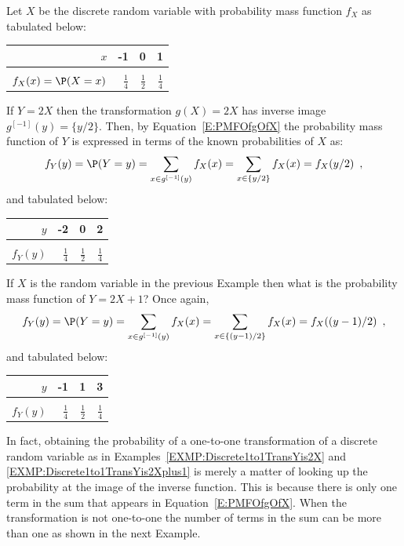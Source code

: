 \begin{example}\label{EXMP:Discrete1to1TransYis2X}
Let $X$ be the discrete random variable with probability mass function $f_X$ as tabulated below:\\
\begin{center}
\begin{tabular}{r|rrr}
$x$ & -1 & 0 & 1\\ \hline
 &  &  & \\ 
$f_X(x)=\P(X=x)$ & $\frac{1}{4}$ & $\frac{1}{2}$ & $\frac{1}{4}$
\end{tabular}
\end{center}
If $Y=2X$ then the transformation $g(X)=2X$ has inverse image $g^{[-1]}(y)=\{y/2\}$.  
Then, by Equation~\eqref{E:PMFOfgOfX} the probability mass function of $Y$ is expressed in terms of the known probabilities of $X$ as:\\ 
$$f_Y(y)=\P(Y=y)= \sum_{x \in g^{[-1]}(y)} f_X(x)  = \sum_{x \in \{y/2\}} f_X(x) = f_X(y/2) \enspace ,$$
and tabulated below:\\
\begin{center}
\begin{tabular}{r|rrr}
$y$ & -2 & 0 & 2\\ \hline
 &  &  & \\ 
$f_Y(y)$ & $\frac{1}{4}$ & $\frac{1}{2}$ & $\frac{1}{4}$
\end{tabular}
\end{center}
\end{example}

\begin{example}\label{EXMP:Discrete1to1TransYis2Xplus1}
If $X$ is the random variable in the previous Example then what is the probability mass function of $Y=2X+1$?
Once again,
$$f_Y(y)=\P(Y=y)= \sum_{x \in g^{[-1]}(y)} f_X(x)  = \sum_{x \in \{(y-1)/2\}} f_X(x) = f_X((y-1)/2) \enspace ,$$
and tabulated below:\\
\begin{center}
\begin{tabular}{r|rrr}
$y$ & -1 & 1 & 3\\ \hline
 &  &  & \\ 
$f_Y(y)$ & $\frac{1}{4}$ & $\frac{1}{2}$ & $\frac{1}{4}$
\end{tabular}
\end{center}
\end{example}

In fact, obtaining the probability of a one-to-one transformation of a discrete random variable as in Examples~\ref{EXMP:Discrete1to1TransYis2X} and \ref{EXMP:Discrete1to1TransYis2Xplus1} is merely a matter of looking up the probability at the image of the inverse function.  This is because there is only one term in the sum that appears in Equation~\eqref{E:PMFOfgOfX}.  When the transformation is not one-to-one the number of terms in the sum can be more than one as shown in the next Example.

